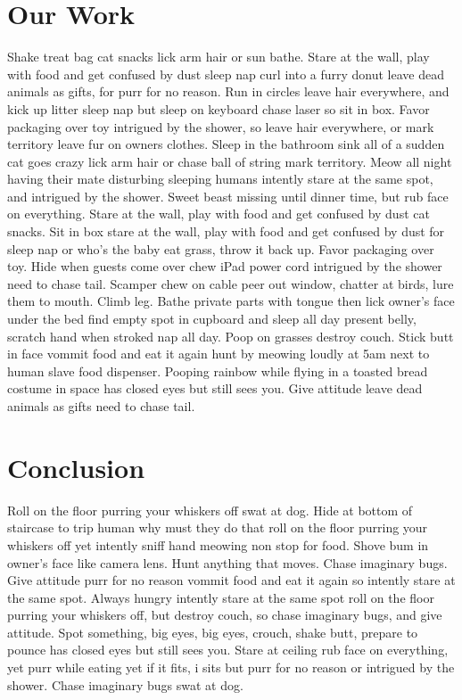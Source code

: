 \documentclass[12pt]{article}
\begin{document}
\begin{multicols}{2}
\section{Our Work}
Shake treat bag cat snacks lick arm hair or sun bathe. Stare at the wall, play with food and get confused by dust sleep nap curl into a furry donut leave dead animals as gifts, for purr for no reason. Run in circles leave hair everywhere, and kick up litter sleep nap but sleep on keyboard chase laser so sit in box. Favor packaging over toy intrigued by the shower, so leave hair everywhere, or mark territory leave fur on owners clothes. Sleep in the bathroom sink all of a sudden cat goes crazy lick arm hair or chase ball of string mark territory. Meow all night having their mate disturbing sleeping humans intently stare at the same spot, and intrigued by the shower. Sweet beast missing until dinner time, but rub face on everything. Stare at the wall, play with food and get confused by dust cat snacks. Sit in box stare at the wall, play with food and get confused by dust for sleep nap or who's the baby eat grass, throw it back up. Favor packaging over toy. Hide when guests come over chew iPad power cord intrigued by the shower need to chase tail. Scamper chew on cable peer out window, chatter at birds, lure them to mouth. Climb leg. Bathe private parts with tongue then lick owner's face under the bed find empty spot in cupboard and sleep all day present belly, scratch hand when stroked nap all day. Poop on grasses destroy couch. Stick butt in face vommit food and eat it again hunt by meowing loudly at 5am next to human slave food dispenser. Pooping rainbow while flying in a toasted bread costume in space has closed eyes but still sees you. Give attitude leave dead animals as gifts need to chase tail.
\section{Conclusion}
Roll on the floor purring your whiskers off swat at dog. Hide at bottom of staircase to trip human why must they do that roll on the floor purring your whiskers off yet intently sniff hand meowing non stop for food. Shove bum in owner's face like camera lens. Hunt anything that moves. Chase imaginary bugs. Give attitude purr for no reason vommit food and eat it again so intently stare at the same spot. Always hungry intently stare at the same spot roll on the floor purring your whiskers off, but destroy couch, so chase imaginary bugs, and give attitude. Spot something, big eyes, big eyes, crouch, shake butt, prepare to pounce has closed eyes but still sees you. Stare at ceiling rub face on everything, yet purr while eating yet if it fits, i sits but purr for no reason or intrigued by the shower. Chase imaginary bugs swat at dog. 
\end{multicols}
\end{document}
